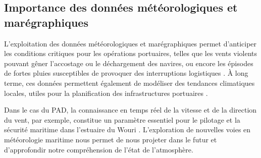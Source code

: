 \documentclass[a4paper,12pt,openany]{report}
\begin{document}
	\subsection{Importance des données météorologiques et  marégraphiques}
	
\quad L’exploitation des données météorologiques et marégraphiques permet d’anticiper les conditions critiques pour les opérations portuaires, telles que les vents violents pouvant gêner l’accostage ou le déchargement des navires, ou encore les épisodes de fortes pluies susceptibles de provoquer des interruptions logistiques \cite{Tang2021}. À long terme, ces données permettent également de modéliser des tendances climatiques locales, utiles pour la planification des infrastructures portuaires \cite{Oueslati2019}.

\quad Dans le cas du PAD, la connaissance en temps réel de la vitesse et de la direction du vent, par exemple, constitue un paramètre essentiel pour le pilotage et la sécurité maritime dans l’estuaire du Wouri \cite{PAD2023}. L’exploration de nouvelles voies en météorologie maritime nous permet de nous projeter dans le futur et d’approfondir notre compréhension de l’état de l’atmosphère.
\end{document}

